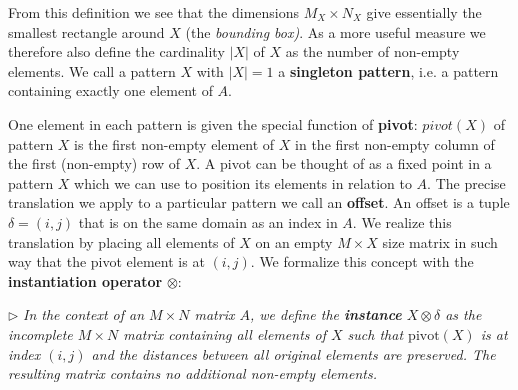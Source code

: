 \documentclass{llncs}
\begin{document}

From this definition we see that the dimensions $M_X\times N_X$ give essentially the smallest rectangle around $X$ (the \emph{bounding box)}. As a more useful measure we therefore also define the cardinality $|X|$ of $X$ as the number of non-empty elements. We call a pattern $X$ with $|X|=1$ a \textbf{singleton pattern}, i.e. a pattern containing exactly one element of $A$. %

One element in each pattern is given the special function of \textbf{pivot}: %
$pivot(X)$ of pattern $X$ is the first non-empty element of $X$ in the first non-empty column of the first (non-empty) row of $X$.
\noindent
A pivot can be thought of as a fixed point in a pattern $X$ which we can use to position its elements in relation to $A$. The precise translation we apply to a particular pattern we call an \textbf{offset}. An offset is a tuple $\delta=(i,j)$ that is on the same domain as an index in $A$. We realize this translation by placing all elements of $X$ on an empty $M\times X$ size matrix in such way that the pivot element is at $(i,j)$. We formalize this concept with the \textbf{instantiation operator} $\otimes$:

\smallskip
\noindent $\triangleright$
\emph{In the context of an $M\times N$ matrix $A$, we define the \textbf{instance} $X \otimes \delta$ as the incomplete $M\times N$ matrix containing all elements of $X$ such that $\mathrm{pivot}(X)$ is at index $(i,j)$ and the distances between all original elements are preserved. The resulting matrix contains no additional non-empty elements. } %
\smallskip
\end{document}
